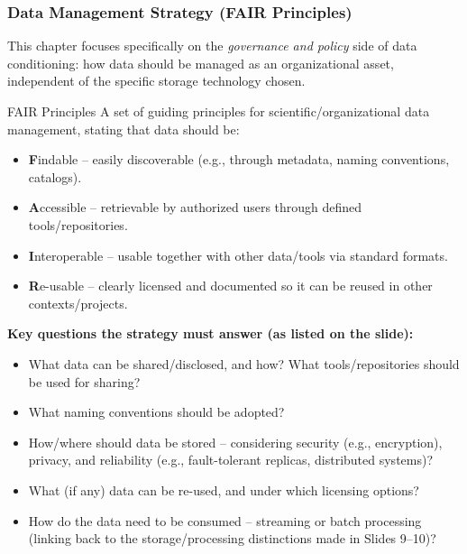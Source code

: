 \subsubsection{Data Management Strategy (FAIR Principles)}

This chapter focuses specifically on the \emph{governance and policy} side of data conditioning: how data should be managed as an organizational asset, independent of the specific storage technology chosen.

\begin{defbox}{FAIR Principles}
A set of guiding principles for scientific/organizational data management, stating that data should be:
\begin{itemize}
    \item \textbf{F}indable -- easily discoverable (e.g., through metadata, naming conventions, catalogs).
    \item \textbf{A}ccessible -- retrievable by authorized users through defined tools/repositories.
    \item \textbf{I}nteroperable -- usable together with other data/tools via standard formats.
    \item \textbf{R}e-usable -- clearly licensed and documented so it can be reused in other contexts/projects.
\end{itemize}
\end{defbox}

\textbf{Key questions the strategy must answer (as listed on the slide):}

\begin{itemize}
    \item What data can be shared/disclosed, and how? What tools/repositories should be used for sharing?
    \vspace{0.2cm}
    \item What naming conventions should be adopted?
    \vspace{0.2cm}
    \item How/where should data be stored -- considering security (e.g., encryption), privacy, and reliability (e.g., fault-tolerant replicas, distributed systems)?
    \vspace{0.2cm}
    \item What (if any) data can be re-used, and under which licensing options?
    \vspace{0.2cm}
    \item How do the data need to be consumed -- streaming or batch processing (linking back to the storage/processing distinctions made in Slides 9--10)?
\end{itemize}

